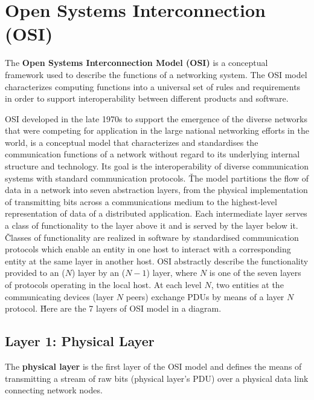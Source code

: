 \section{Open Systems Interconnection (OSI)}

The \textbf{Open Systems Interconnection Model (OSI)} is a conceptual framework used to describe the functions of a
networking system. The OSI model characterizes computing functions into a universal set of rules and requirements in
order to support interoperability between different products and software.
\ed

OSI developed in the late 1970s to support the emergence of the diverse networks that were competing for application
in the large national networking efforts in the world, is a conceptual model that characterizes and standardises the
communication functions of a network without regard to its underlying internal structure and technology. Its goal is
the interoperability of diverse communication systems with standard communication protocols. \v

The model partitions the flow of data in a network into seven abstraction layers, from the physical implementation of
transmitting bits across a communications medium to the highest-level representation of data of a distributed
application. Each intermediate layer serves a class of functionality to the layer above it and is served by the layer
below it. \v

Classes of functionality are realized in software by standardised communication protocols which enable an entity in
one host to interact with a corresponding entity at the same layer in another host. OSI abstractly describe the
functionality provided to an ($N$) layer by an ($N-1$) layer, where $N$ is one of the seven layers of protocols
operating in the local host. At each level $N$, two entities at the communicating devices (layer $N$ peers) exchange
PDUs by means of a layer $N$ protocol. \v

Here are the 7 layers of OSI model in a diagram.


\subsection{Layer 1: Physical Layer}

The \textbf{physical layer} is the first layer of the OSI model and defines the means of transmitting a stream of raw
bits (physical layer's PDU) over a physical data link connecting network nodes.
\ed


